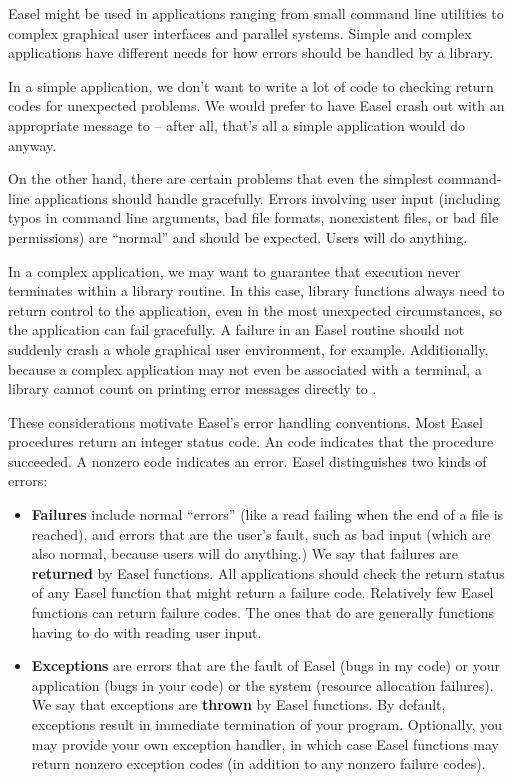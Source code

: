 Easel might be used in applications ranging from small command line
utilities to complex graphical user interfaces and parallel
systems. Simple and complex applications have different needs for how
errors should be handled by a library.

In a simple application, we don't want to write a lot of code to
checking return codes for unexpected problems. We would prefer to have
Easel crash out with an appropriate message to  -- after
all, that's all a simple application would do anyway.

On the other hand, there are certain problems that even the simplest
command-line applications should handle gracefully. Errors involving
user input (including typos in command line arguments, bad file
formats, nonexistent files, or bad file permissions) are ``normal''
and should be expected. Users will do anything.

In a complex application, we may want to guarantee that execution
never terminates within a library routine. In this case, library
functions always need to return control to the application, even in
the most unexpected circumstances, so the application can fail
gracefully. A failure in an Easel routine should not suddenly crash a
whole graphical user environment, for example. Additionally, because a
complex application may not even be associated with a terminal, a
library cannot count on printing error messages directly to
.

These considerations motivate Easel's error handling conventions.
Most Easel procedures return an integer status code. An 
code indicates that the procedure succeeded. A nonzero code indicates
an error. Easel distinguishes two kinds of errors:

\begin{itemize}
\item \textbf{Failures} include normal ``errors'' (like a read failing
  when the end of a file is reached), and errors that are the user's
  fault, such as bad input (which are also normal, because users will
  do anything.) We say that failures are \textbf{returned} by Easel
  functions. All applications should check the return status of any
  Easel function that might return a failure code. Relatively few
  Easel functions can return failure codes. The ones that do are
  generally functions having to do with reading user input.

\item \textbf{Exceptions} are errors that are the fault of Easel (bugs
in my code) or your application (bugs in your code) or the system
(resource allocation failures). We say that exceptions are
\textbf{thrown} by Easel functions. By default, exceptions result in
immediate termination of your program. Optionally, you may provide
your own exception handler, in which case Easel functions may return
nonzero exception codes (in addition to any nonzero failure codes).
\end{itemize}

